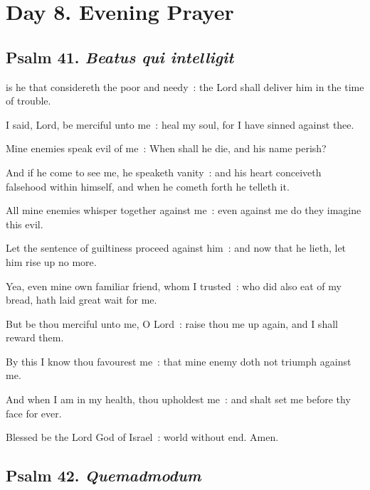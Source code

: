 \section*{Day 8. Evening Prayer}

\subsection{Psalm 41. \textit{Beatus qui intelligit}}

 is he that considereth the poor and needy~: the Lord shall deliver him in the time of trouble.\par
{}
I said, Lord, be merciful unto me~: heal my soul, for I have sinned against thee.\par
{}Mine enemies speak evil of me~: When shall he die, and his name perish?\par
{}And if he come to see me, he speaketh vanity~: and his heart conceiveth falsehood within himself, and when he cometh forth he telleth it.\par
{}All mine enemies whisper together against me~: even against me do they imagine this evil.\par
{}Let the sentence of guiltiness proceed against him~: and now that he lieth, let him rise up no more.\par
{}Yea, even mine own familiar friend, whom I trusted~: who did also eat of my bread, hath laid great wait for me.\par
{}But be thou merciful unto me, O Lord~: raise thou me up again, and I shall reward them.\par
{}By this I know thou favourest me~: that mine enemy doth not triumph against me.\par
{}And when I am in my health, thou upholdest me~: and shalt set me before thy face for ever.\par
{}Blessed be the Lord God of Israel~: world without end. Amen.\par

\subsection{Psalm 42. \textit{Quemadmodum}}

